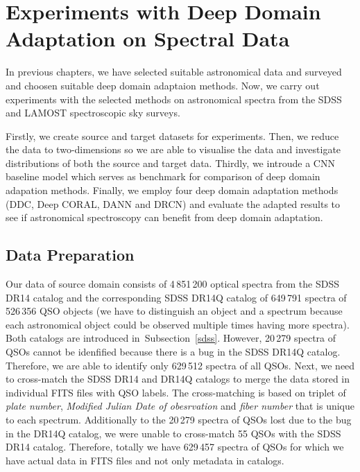 \chapter{Experiments with Deep Domain Adaptation on Spectral Data}
\label{exp_chapter}

In previous chapters, we have selected suitable astronomical data
and surveyed and choosen suitable deep domain adaptaion methods.
Now, we carry out experiments with the selected methods
on astronomical spectra from the SDSS and LAMOST spectroscopic sky surveys.

Firstly, we create source and target datasets for experiments.
Then, we reduce the data to two-dimensions
so we are able to visualise the data
and investigate distributions of both the source and target data.
Thirdly, we introude a CNN baseline model
which serves as benchmark for comparison of deep domain adapation methods.
Finally, we employ four deep domain adaptation methods
(DDC, Deep CORAL, DANN and DRCN)
and evaluate the adapted results to see 
if astronomical spectroscopy can benefit from deep domain adaptation.

\section{Data Preparation}


Our data of source domain consists of 4\,851\,200 optical spectra from the SDSS DR14 catalog
and the corresponding SDSS DR14Q catalog of 649\,791 spectra of 526\,356 QSO objects
(we have to distinguish an object and a spectrum
because each astronomical object could be observed multiple times
having more spectra).
Both catalogs are introduced in~Subsection~\ref{sdss}.
However, 20\,279 spectra of QSOs cannot be idenfified
because there is a bug in the SDSS DR14Q catalog.
Therefore, we are able to identify only 629\,512 spectra of all QSOs.
Next, we need to cross-match the SDSS DR14 and DR14Q catalogs
to merge the data stored in individual FITS files with QSO labels.
The cross-matching is based on triplet of
\textit{plate number}, \textit{Modified Julian Date of obesrvation} and \textit{fiber number} that is unique to each spectrum.
Additionally to the 20\,279 spectra of QSOs lost due to the bug in the DR14Q catalog,
we were unable to cross-match 55 QSOs with the SDSS DR14 catalog.
Therefore, totally we have 629\,457 spectra of QSOs
for which we have actual data in FITS files and not only metadata in catalogs.

